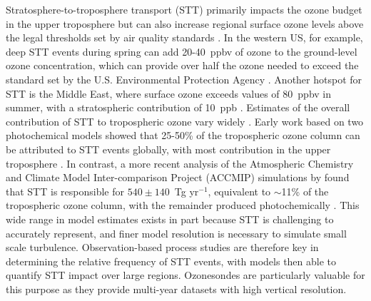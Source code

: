   Stratosphere-to-troposphere transport (STT) primarily impacts the ozone budget in the upper troposphere but can also increase regional surface ozone levels above the legal thresholds set by air quality standards \citep{Danielson1968, Lelieveld2009, Lefohn2011, Langford2012, Zhang2014, Lin2015}.
  In the western US, for example, deep STT events during spring can add 20-40~ppbv of ozone to the ground-level ozone concentration, which can provide over half the ozone needed to exceed the standard set by the U.S. Environmental Protection Agency \citep{Lin2012, Lin2015}.
  Another hotspot for STT is the Middle East, where surface ozone exceeds values of 80~ppbv in summer, with a stratospheric contribution of 10~ppb \citep{Lelieveld2009}.
  Estimates of the overall contribution of STT to tropospheric ozone vary widely \citep[e.g.][]{Galani2003, Stohl2003, Stevenson2006, Lefohn2011}.
  Early work based on two photochemical models showed that 25-50\% of the tropospheric ozone column can be attributed to STT events globally, with most contribution in the upper troposphere \citep{Stohl2003}.
  In contrast, a more recent analysis of the Atmospheric Chemistry and Climate Model Inter-comparison Project (ACCMIP) simulations by \citet{Young2013} found that STT is responsible for $540\pm140$~Tg yr$^{-1}$, equivalent to $\sim$11\% of the tropospheric ozone column, with the remainder produced photochemically \citep{Monks2015}.
  This wide range in model estimates exists in part because STT is challenging to accurately represent, and finer model resolution is necessary to simulate small scale turbulence.
  Observation-based process studies are therefore key in determining the relative frequency of STT events, with models then able to quantify STT impact over large regions.
  Ozonesondes are particularly valuable for this purpose as they provide multi-year datasets with high vertical resolution.
  
